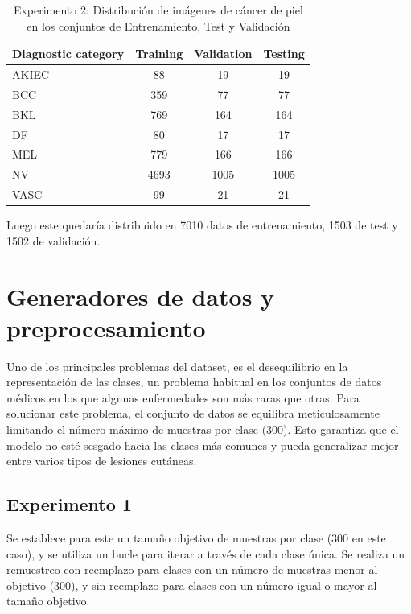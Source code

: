 \begin{table}[ht]
   \centering
   \begin{tabular}{lccc}
   \hline
   Diagnostic category & Training & Validation & Testing \\ \hline
   AKIEC & 88 & 19 & 19 \\
   BCC & 359 & 77 & 77 \\
   BKL & 769 & 164 & 164 \\
   DF & 80 & 17 & 17 \\
   MEL & 779 & 166 & 166 \\
   NV & 4693 & 1005 & 1005 \\
   VASC & 99 & 21 & 21 \\ \hline
   \end{tabular}
   \caption{Experimento 2: Distribución de imágenes de cáncer de piel en los conjuntos de Entrenamiento, Test y Validación}
   \label{tab:train_test_validate_e2}
\end{table}

Luego este quedaría distribuido en 7010 datos de entrenamiento, 1503 de test y 1502 de validación.

\section{Generadores de datos y preprocesamiento}

Uno de los principales problemas del dataset, es el desequilibrio en la representación de las clases, un problema habitual en los conjuntos de datos médicos en los que algunas enfermedades son más raras que otras. Para solucionar este problema, el conjunto de datos se equilibra meticulosamente limitando el número máximo de muestras por clase (300). Esto garantiza que el modelo no esté sesgado hacia las clases más comunes y pueda generalizar mejor entre varios tipos de lesiones cutáneas.

\subsection{Experimento 1}

Se establece para este un tamaño objetivo de muestras por clase (300 en este caso), y se utiliza un bucle para iterar a través de cada clase única. Se realiza un remuestreo con reemplazo para clases con un número de muestras menor al objetivo (300), y sin reemplazo para clases con un número igual o mayor al tamaño objetivo.

